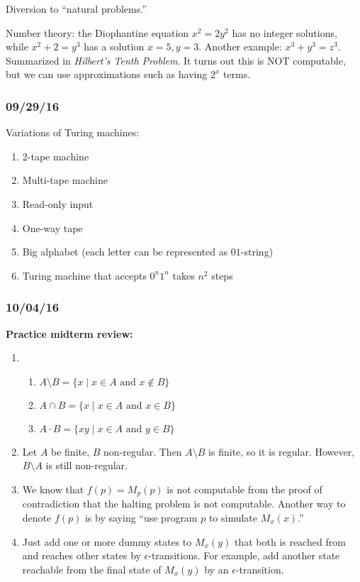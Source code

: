 \documentclass[a4paper,12pt]{article}
\theoremstyle{remark}
\theoremstyle{definition}
\begin{document}
Diversion to ``natural problems.'' \par
Number theory: the Diophantine equation $x^2 = 2y^2$ has no integer solutions, while $x^2 + 2 = y^3$ has a solution $x = 5, y = 3$. Another example: $x^3 + y^3 = z^3$. Summarized in \emph{Hilbert's Tenth Problem}. It turns out this is NOT computable, but we can use approximations such as having $2^x$ terms.

\subsubsection*{09/29/16}
Variations of Turing machines:
\begin{enumerate}
    \item
        2-tape machine
    \item
        Multi-tape machine
    \item
        Read-only input
    \item
        One-way tape
    \item
        Big alphabet (each letter can be represented as $01$-string)
    \item
        Turing machine that accepts $0^n 1^n$ takes $n^2$ steps
\end{enumerate}

\subsubsection*{10/04/16}
\textbf{Practice midterm review:}
\begin{enumerate}
    \item
        \begin{enumerate}
            \item
                $A \setminus B = \{ x \mid x \in A \text{ and } x \notin B \}$
            \item
                $A \cap B = \{ x \mid x \in A \text { and } x \in B \}$
            \item
                $A \cdot B = \{ xy \mid x \in A \text { and } y \in B \}$
        \end{enumerate}

    \item
        Let $A$ be finite, $B$ non-regular. Then $A \setminus B$ is finite, so it is regular. However, $B \setminus A$ is still non-regular.

    \item
        We know that $f(p) = M_p(p)$ is not computable from the proof of contradiction that the halting problem is not computable. Another way to denote $f(p)$ is by saying ``use program $p$ to simulate $M_x(x)$.''

    \item
        Just add one or more dummy states to $M_x(y)$ that both is reached from and reaches other states by $\epsilon$-transitions. For example, add another state reachable from the final state of $M_x(y)$ by an $\epsilon$-transition.
\end{enumerate}
\end{document}
